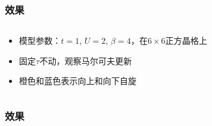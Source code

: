 \documentclass[UTF8]{ctexbeamer}
\begin{document}
\begin{frame}
\frametitle{效果}
    
\begin{columns}

\begin{column}{0.4\textwidth}
    \begin{itemize}
        \item 模型参数：$t=1$, $U=2$, $\beta=4$，在$6 \times 6$正方晶格上
        \item 固定$\tau$不动，观察马尔可夫更新
        \item 橙色和蓝色表示向上和向下自旋
    \end{itemize}
\end{column}

\begin{column}{0.6\textwidth}
\end{column}

\end{columns}   
    
\end{frame}

\begin{frame}
\frametitle{效果}

    

\end{frame}
\end{document}
